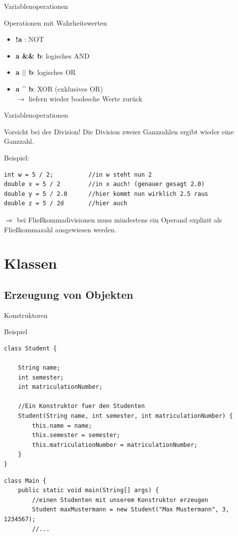 \documentclass[18pt]{beamer}
\begin{document}
\begin{frame}{Variablenoperationen}
\begin{block}{Operationen mit Wahrheitswerten}
\begin{itemize}
	\item \textbf{!a} : NOT
	\item  \textbf{a \&\& b}: logisches AND
	\item \textbf{a $||$ b}: logisches OR
	\item \textbf{a \^{} b}: XOR (exklusives OR)\\
	$\rightarrow$ liefern wieder boolesche Werte zurück
\end{itemize}
\end{block}
\end{frame}

\begin{frame}[fragile]{Variablenoperationen}
\begin{alertblock}{Vorsicht bei der Division!}
Die Division zweier Ganzzahlen ergibt wieder eine Ganzzahl.
\end{alertblock}

\begin{exampleblock} {Beispiel:}
\begin{lstlisting}
int w = 5 / 2;			//in w steht nun 2
double x = 5 / 2		//in x auch! (genauer gesagt 2.0)
double y = 5 / 2.0		//hier kommt nun wirklich 2.5 raus
double z = 5 / 2d		//hier auch
\end{lstlisting}
\end{exampleblock}
\pause
$\Rightarrow$ bei Fließkommadivisionen muss mindestens ein Operand explizit als Fließkommazahl ausgewiesen werden.
\end{frame}


\section{Klassen}

\subsection{Erzeugung von Objekten}
\begin{frame}[containsverbatim]{Konstruktoren}
\begin{exampleblock}{Beispiel}
\begin{lstlisting}[basicstyle=\scriptsize]
class Student {

	String name;
	int semester;
	int matriculationNumber;
	
	//Ein Konstruktor fuer den Studenten
	Student(String name, int semester, int matriculationNumber) {
		this.name = name;
		this.semester = semester;
		this.matriculationNumber = matriculationNumber;
	}
}
\end{lstlisting}
\begin{lstlisting}[basicstyle=\scriptsize]
class Main {
	public static void main(String[] args) {
		//einen Studenten mit unserem Konstruktor erzeugen
		Student maxMustermann = new Student("Max Mustermann", 3, 1234567);
		//...
\end{lstlisting}
\end{exampleblock}
\end{frame}
\end{document}
